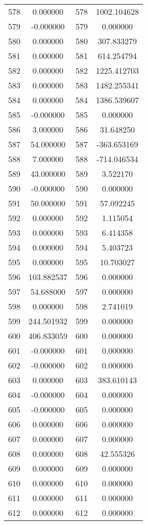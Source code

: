 \documentclass[12pt]{article}
\begin{document}
\begin{longtable}{@{}cccc@{}}
578 & 0.000000 & 578 & 1002.104628 \\
579 & -0.000000 & 579 & 0.000000 \\
580 & 0.000000 & 580 & 307.833279 \\
581 & 0.000000 & 581 & 614.254794 \\
582 & 0.000000 & 582 & 1225.412703 \\
583 & 0.000000 & 583 & 1482.255341 \\
584 & 0.000000 & 584 & 1386.539607 \\
585 & -0.000000 & 585 & 0.000000 \\
586 & 3.000000 & 586 & 31.648250 \\
587 & 54.000000 & 587 & -363.653169 \\
588 & 7.000000 & 588 & -714.046534 \\
589 & 43.000000 & 589 & 3.522170 \\
590 & -0.000000 & 590 & 0.000000 \\
591 & 50.000000 & 591 & 57.092245 \\
592 & 0.000000 & 592 & 1.115054 \\
593 & 0.000000 & 593 & 6.414358 \\
594 & 0.000000 & 594 & 5.403723 \\
595 & 0.000000 & 595 & 10.703027 \\
596 & 103.882537 & 596 & 0.000000 \\
597 & 54.688000 & 597 & 0.000000 \\
598 & 0.000000 & 598 & 2.741019 \\
599 & 244.501932 & 599 & 0.000000 \\
600 & 406.833059 & 600 & 0.000000 \\
601 & -0.000000 & 601 & 0.000000 \\
602 & -0.000000 & 602 & 0.000000 \\
603 & 0.000000 & 603 & 383.610143 \\
604 & -0.000000 & 604 & 0.000000 \\
605 & -0.000000 & 605 & 0.000000 \\
606 & 0.000000 & 606 & 0.000000 \\
607 & 0.000000 & 607 & 0.000000 \\
608 & 0.000000 & 608 & 42.555326 \\
609 & 0.000000 & 609 & 0.000000 \\
610 & 0.000000 & 610 & 0.000000 \\
611 & 0.000000 & 611 & 0.000000 \\
612 & 0.000000 & 612 & 0.000000 \\

\end{longtable}
\end{document}
